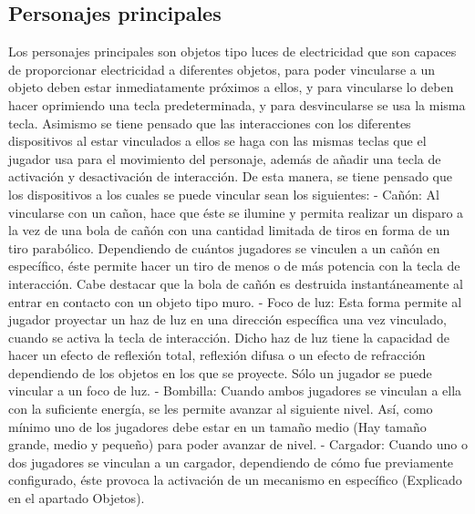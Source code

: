 \documentclass{article}
\begin{document}
\subsection{Personajes principales}
Los personajes principales son objetos tipo luces de electricidad que son capaces de proporcionar electricidad a diferentes objetos, para poder vincularse a un objeto deben estar inmediatamente próximos a ellos, y para vincularse lo deben hacer oprimiendo una tecla predeterminada, y para desvincularse se usa la misma tecla. Asimismo se tiene pensado que las interacciones con los diferentes dispositivos al estar vinculados a ellos se haga con las mismas teclas que el jugador usa para el movimiento del personaje, además de añadir una tecla de activación y desactivación de interacción. De esta manera, se tiene pensado que los dispositivos a los cuales se puede vincular sean los siguientes:
    - Cañón: Al vincularse con un cañon, hace que éste se ilumine y permita realizar un disparo a la vez de una bola de cañón con una cantidad limitada de tiros en forma de un tiro parabólico. Dependiendo de cuántos jugadores se vinculen a un cañón en específico, éste permite hacer un tiro de menos o de más potencia con la tecla de interacción. Cabe destacar que la bola de cañón es destruida instantáneamente al entrar en contacto con un objeto tipo muro.
    - Foco de luz: Esta forma permite al jugador proyectar un haz de luz en una dirección específica una vez vinculado, cuando se activa la tecla de interacción. Dicho haz de luz tiene la capacidad de hacer un efecto de reflexión total, reflexión difusa o un efecto de refracción dependiendo de los objetos en los que se proyecte. Sólo un jugador se puede vincular a un foco de luz.
    - Bombilla: Cuando ambos jugadores se vinculan a ella con la suficiente energía, se les permite avanzar al siguiente nivel. Así, como mínimo uno de los jugadores debe estar en un tamaño medio (Hay tamaño grande, medio y pequeño) para poder avanzar de nivel.
    - Cargador: Cuando uno o dos jugadores se vinculan a un cargador, dependiendo de cómo fue previamente configurado, éste provoca la activación de un mecanismo en específico (Explicado en el apartado Objetos).
\end{document}

